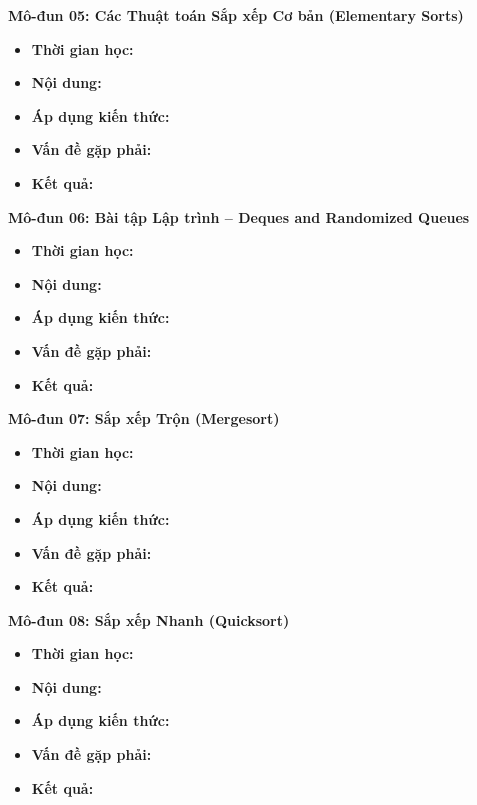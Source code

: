 \documentclass[11pt, a4paper]{article}
\begin{document}
\vspace{0.15cm}

\noindent\textbf{Mô-đun 05: Các Thuật toán Sắp xếp Cơ bản (Elementary Sorts)}
\begin{itemize}
    \item \textbf{Thời gian học:} 
    \item \textbf{Nội dung:} 
    \item \textbf{Áp dụng kiến thức:} 
    \item \textbf{Vấn đề gặp phải:} 
    \item \textbf{Kết quả:} 
\end{itemize}

\vspace{0.15cm}

\noindent\textbf{Mô-đun 06: Bài tập Lập trình -- Deques and Randomized Queues}
\begin{itemize}
    \item \textbf{Thời gian học:} 
    \item \textbf{Nội dung:} 
    \item \textbf{Áp dụng kiến thức:} 
    \item \textbf{Vấn đề gặp phải:} 
    \item \textbf{Kết quả:} 
\end{itemize}

\vspace{0.15cm}

\noindent\textbf{Mô-đun 07: Sắp xếp Trộn (Mergesort)}
\begin{itemize}
    \item \textbf{Thời gian học:} 
    \item \textbf{Nội dung:} 
    \item \textbf{Áp dụng kiến thức:} 
    \item \textbf{Vấn đề gặp phải:} 
    \item \textbf{Kết quả:} 
\end{itemize}

\vspace{0.15cm}

\noindent\textbf{Mô-đun 08: Sắp xếp Nhanh (Quicksort)}
\begin{itemize}
    \item \textbf{Thời gian học:} 
    \item \textbf{Nội dung:} 
    \item \textbf{Áp dụng kiến thức:} 
    \item \textbf{Vấn đề gặp phải:} 
    \item \textbf{Kết quả:} 
\end{itemize}
\end{document}
